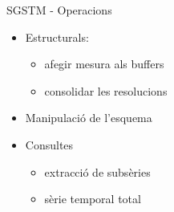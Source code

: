 \begin{frame}{SGSTM - Operacions}

  \begin{itemize}
  \item Estructurals: 
    \begin{itemize}
    \item afegir mesura als buffers 
    \item consolidar les resolucions
    \end{itemize}

  \item Manipulació de l'esquema

  \item Consultes
    \begin{itemize}
    \item extracció de subsèries
    \item sèrie temporal total
    \end{itemize}

  \end{itemize}


\end{frame}



